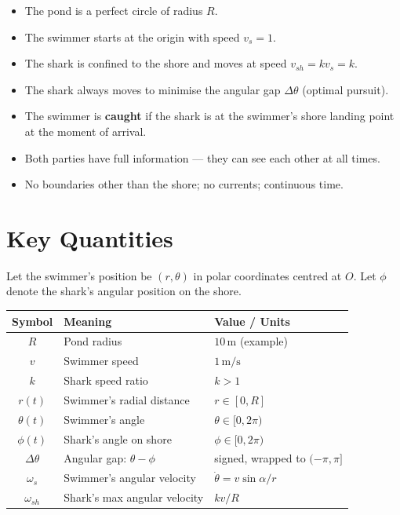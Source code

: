 \documentclass[12pt, a4paper]{article}
\theoremstyle{definition}
\begin{document}
\begin{itemize}[leftmargin=2em, itemsep=4pt]
  \item The pond is a perfect circle of radius $R$.
  \item The swimmer starts at the origin with speed $v_s = 1$.
  \item The shark is confined to the shore and moves at speed $v_{sh} = kv_s = k$.
  \item The shark always moves to minimise the angular gap $\Delta\theta$ (optimal pursuit).
  \item The swimmer is \textbf{caught} if the shark is at the swimmer's shore landing point at the moment of arrival.
  \item Both parties have full information — they can see each other at all times.
  \item No boundaries other than the shore; no currents; continuous time.
\end{itemize}

\section{Key Quantities}

Let the swimmer's position be $(r, \theta)$ in polar coordinates centred at $O$.
Let $\phi$ denote the shark's angular position on the shore.

\vspace{0.5em}
\begin{center}
\renewcommand{\arraystretch}{1.5}
\begin{tabular}{cll}
  \toprule
  \textbf{Symbol} & \textbf{Meaning} & \textbf{Value / Units} \\
  \midrule
  $R$             & Pond radius              & $10\,\text{m}$ (example) \\
  $v$             & Swimmer speed            & $1\,\text{m/s}$ \\
  $k$             & Shark speed ratio        & $k > 1$ \\
  $r(t)$          & Swimmer's radial distance & $r \in [0, R]$ \\
  $\theta(t)$     & Swimmer's angle          & $\theta \in [0, 2\pi)$ \\
  $\phi(t)$       & Shark's angle on shore   & $\phi \in [0, 2\pi)$ \\
  $\Delta\theta$  & Angular gap: $\theta - \phi$ & signed, wrapped to $(-\pi, \pi]$ \\
  $\omega_s$      & Swimmer's angular velocity & $\dot\theta = v\sin\alpha / r$ \\
  $\omega_{sh}$   & Shark's max angular velocity & $kv / R$ \\
  \bottomrule
\end{tabular}
\end{center}
\end{document}
